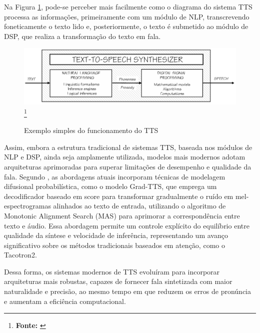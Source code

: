 Na Figura \ref{fig:5}, pode-se perceber mais facilmente como o diagrama do sistema TTS processa as informações, primeiramente com um módulo de NLP, transcrevendo foneticamente o texto lido e, posteriormente, o texto é submetido ao módulo de DSP, que realiza a transformação do texto em fala.

\begin{figure}[!h]
     \caption{Exemplo simples do funcionamento do TTS}
     \centering
     \includegraphics[width=0.7\linewidth]{imagens/tts.png}
     \label{fig:5}
     \footnote{\textbf{Fonte:} \cite{Dutoit1997}}
\end{figure}

Assim, embora a estrutura tradicional de sistemas TTS, baseada nos módulos de NLP e DSP, ainda seja amplamente utilizada, modelos mais modernos adotam arquiteturas aprimoradas para superar limitações de desempenho e qualidade da fala. Segundo , as abordagens atuais incorporam técnicas de modelagem difusional probabilística, como o modelo Grad-TTS, que emprega um decodificador baseado em score para transformar gradualmente o ruído em mel-espectrogramas alinhados ao texto de entrada, utilizando o algoritmo de Monotonic Alignment Search (MAS) para aprimorar a correspondência entre texto e áudio. Essa abordagem permite um controle explícito do equilíbrio entre qualidade da síntese e velocidade de inferência, representando um avanço significativo sobre os métodos tradicionais baseados em atenção, como o Tacotron2.

Dessa forma, os sistemas modernos de TTS evoluíram para incorporar arquiteturas mais robustas, capazes de fornecer fala sintetizada com maior naturalidade e precisão, ao mesmo tempo em que reduzem os erros de pronúncia e aumentam a eficiência computacional.